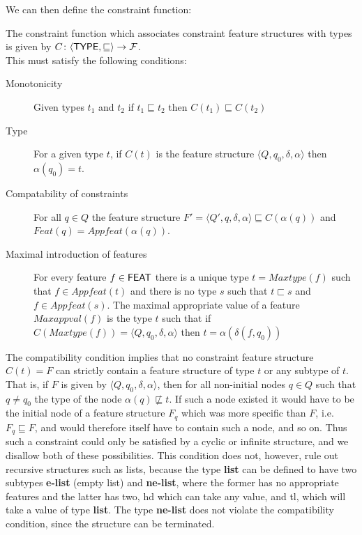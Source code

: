 \documentclass[12pt]{report}
\begin{document}
We can then define the constraint function:
\begin{definition} The constraint function which
associates
constraint feature structures with types is given by
$C\colon \langle {\sf TYPE},\sqsubseteq\rangle\to {\cal F}$.\\
This must satisfy the following conditions:
\begin{description}
\item[Monotonicity] Given types  $t_{1}$ and $t_{2}$  if
$t_{1} \sqsubseteq t_{2}$ then $C(t_{1}) \sqsubseteq C(t_{2})$
\item[Type] For a given type $t$, if $C(t)$ is the feature structure
$\langle Q,q_{0},\delta,\alpha\rangle$ then 
$\alpha({q_{0}})=t$.
\item[Compatability of constraints] 
For all $q \in Q$ the feature structure
$F'= \langle Q',q,\delta,\alpha\rangle 
\sqsubseteq C(\alpha(q))$ and $Feat(q) = Appfeat(\alpha(q))$.

\item[Maximal introduction of features] 
For every feature $f \in {\sf FEAT}$
there is a unique type $t = Maxtype(f)$ such that 
$f \in Appfeat(t)$ 
and there is no type $s$ such that  $t \sqsubset s$
and $f \in Appfeat(s)$.
The maximal appropriate value of a feature $Maxappval(f)$ is the type $t$
such that if $C(Maxtype(f))= \langle Q,q_{0},\delta,\alpha\rangle$ then 
$t=\alpha (\delta (f, {q_{0}})) $
\end{description}
\end{definition}

The compatibility condition implies that no constraint feature
structure $C(t)=F$ can strictly contain a feature structure of type $t$
or any subtype of $t$.  That is, if $F$ is given by 
$\langle Q,q_{0},\delta,\alpha\rangle$, then for all non-initial nodes
$q\in Q$ such that $q \neq {q_{0}} $ the type of the node $\alpha(q) \not\sqsubseteq t$.
If such a node existed it would have to be the initial node of a
feature structure $F_q$ which was more specific than $F$, 
i.e.~$F_q \sqsubseteq F$, and would therefore itself have to contain such
a node, and so on.  Thus such a constraint could only be satisfied by
a cyclic or infinite structure, and we disallow both of these possibilities.
This condition does not, however, rule out recursive structures such
as lists, because the type {\bf list} can be defined to have two
subtypes {\bf e-list} (empty list) and {\bf ne-list}, where the former
has no appropriate features and the latter has two, {\sc hd} which
can take any value, and {\sc tl}, which will take a value of type
{\bf list}.  The type {\bf ne-list} does not violate the
compatibility condition, since the structure can be terminated.
\end{document}
